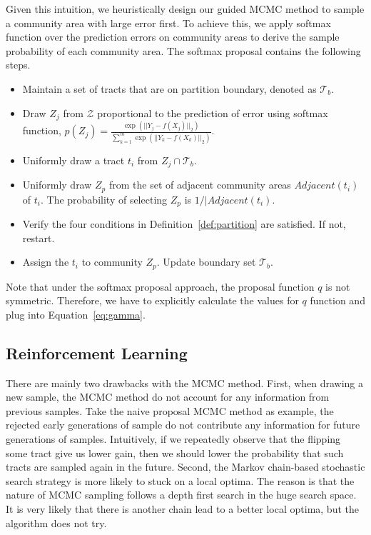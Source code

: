 Given this intuition, we heuristically design our guided MCMC method to sample a community area with large error first. To achieve this, we apply softmax function over the prediction errors on community areas to derive the sample probability of each community area. The softmax proposal contains the following steps. 
\begin{itemize}
  \item Maintain a set of tracts that are on partition boundary, denoted as $\mathcal{T}_b$.
  \item Draw $Z_j$ from $\mathcal{Z}$ proportional to the prediction of error using softmax function, $p(Z_j) = \frac{ \exp(||Y_j - f(X_j)||_2) }{ \sum_{k=1}^m \exp(||Y_k - f(X_k)||_2)}$.
  \item Uniformly draw a tract $t_i$ from $Z_j \cap \mathcal{T}_b$.
  \item Uniformly draw $Z_p$ from the set of adjacent community areas $Adjacent(t_i)$ of $t_i$. The probability of selecting $Z_p$ is $1/|Adjacent(t_i)$.
  \item Verify the four conditions in Definition~\ref{def:partition} are satisfied. If not, restart.
  \item Assign the $t_i$ to community $Z_p$. Update boundary set $\mathcal{T}_b$.
\end{itemize}

Note that under the softmax proposal approach, the proposal function $q$ is not symmetric. Therefore, we have to explicitly calculate the values for $q$ function and plug into Equation~\ref{eq:gamma}.



\subsection{Reinforcement Learning}

There are mainly two drawbacks with the MCMC method. First, when drawing a new sample, the MCMC method do not account for any information from previous samples. Take the naive proposal MCMC method as example, the rejected early generations of sample do not contribute any information for future generations of samples. Intuitively, if we repeatedly observe that the flipping some tract give us lower gain, then we should lower the probability that such tracts are sampled again in the future. Second, the Markov chain-based stochastic search strategy is more likely to stuck on a local optima. The reason is that the nature of MCMC sampling follows a depth first search in the huge search space. It is very likely that there is another chain lead to a better local optima, but the algorithm does not try.


